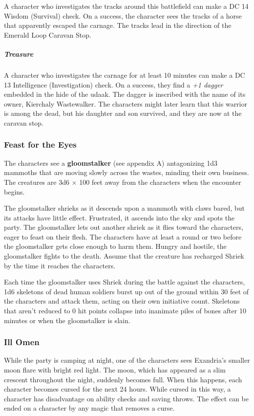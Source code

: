 \documentclass[10pt,a4paper,twoside,fancy,bg=print,twocolumn,openany,nodeprecatedcode]{dndbook}
\begin{document}
A character who investigates the tracks around this battlefield can make a DC 14 Wisdom (Survival) check. On a success, the character sees the tracks of a horse that apparently escaped the carnage. The tracks lead in the direction of the Emerald Loop Caravan Stop.

\subparagraph{Treasure}
A character who investigates the carnage for at least 10 minutes can make a DC 13 Intelligence (Investigation) check. On a success, they find a \textit{+1 dagger} embedded in the hide of the udaak. The dagger is inscribed with the name of its owner, Kierchaly Wastewalker. The characters might later learn that this warrior is among the dead, but his daughter and son survived, and they are now at the caravan stop.

\subsubsection{Feast for the Eyes}
The characters see a \textbf{gloomstalker} (see appendix A) antagonizing 1d3 mammoths that are moving slowly across the wastes, minding their own business. The creatures are 3d6 × 100 feet away from the characters when the encounter begins.

The gloomstalker shrieks as it descends upon a mammoth with claws bared, but its attacks have little effect. Frustrated, it ascends into the sky and spots the party. The gloomstalker lets out another shriek as it flies toward the characters, eager to feast on their flesh. The characters have at least a round or two before the gloomstalker gets close enough to harm them. Hungry and hostile, the gloomstalker fights to the death. Assume that the creature has recharged Shriek by the time it reaches the characters.

Each time the gloomstalker uses Shriek during the battle against the characters, 1d6 skeletons of dead human soldiers burst up out of the ground within 30 feet of the characters and attack them, acting on their own initiative count. Skeletons that aren't reduced to 0 hit points collapse into inanimate piles of bones after 10 minutes or when the gloomstalker is slain.

\subsubsection{Ill Omen}
While the party is camping at night, one of the characters sees Exandria's smaller moon flare with bright red light. The moon, which has appeared as a slim crescent throughout the night, suddenly becomes full. When this happens, each character becomes cursed for the next 24 hours. While cursed in this way, a character has disadvantage on ability checks and saving throws. The effect can be ended on a character by any magic that removes a curse.
\end{document}
